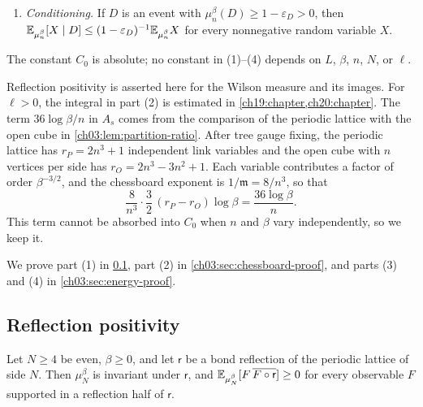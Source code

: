 \begin{theorem}
\begin{enumerate}
\[
 A_s(n,\beta)=C_0+24\log\frac1{1-s}+\frac{36\log\beta}{n}.
\]
Then for every deterministic set $S$ of plaquettes,
\[
 \E_{\mu_n^\beta}\exp\Bigl(\frac s8\sum_{p\in S}\beta q(U_p)\Bigr)\le e^{A_s(n,\beta)\abs S/8}.
\]
For $K\ge0$ and a cell $Q$ let $D_Q(K)=\{\max_{p\subset Q}\beta q(U_p)\ge K\}$. For distinct cells $Q_{t_1},\dots,Q_{t_k}$ of one tiling,
\[
 \mu_n^\beta\Bigl(\bigcap_{j=1}^kD_{Q_{t_j}}(K)\Bigr)\le\bigl[6e^{A_s(n,\beta)-sK}\bigr]^k
\]
and
\[
 \mu_n^\beta\Bigl\{\max_p\beta q(U_p)\ge K\Bigr\}\le\min\bigl\{1,6n^3e^{A_s(n,\beta)-sK}\bigr\}.
\]
If $\beta\le b_+n$ for some $b_+>0$, then $36\log\beta/n\le36b_+/\mathrm e$.
\item\emph{Conditioning.} If $D$ is an event with $\mu_n^\beta(D)\ge1-\varepsilon_D>0$, then $\mathbb E_{\mu_n^\beta}[X\mid D]\le(1-\varepsilon_D)^{-1}\mathbb E_{\mu_n^\beta}X$ for every nonnegative random variable $X$.
\end{enumerate}
The constant $C_0$ is absolute; no constant in (1)--(4) depends on $L$, $\beta$, $n$, $N$, or $\ell$.
\end{theorem}

\begin{remark}\label{ch03:rem:chessboard-scope}
Reflection positivity is asserted here for the Wilson measure and its images. For $\ell>0$, the integral in part (2) is estimated in \cref{ch19:chapter,ch20:chapter}. The term $36\log\beta/n$ in $A_s$ comes from the comparison of the periodic lattice with the open cube in \cref{ch03:lem:partition-ratio}. After tree gauge fixing, the periodic lattice has $r_P=2n^3+1$ independent link variables and the open cube with $n$ vertices per side has $r_O=2n^3-3n^2+1$. Each variable contributes a factor of order $\beta^{-3/2}$, and the chessboard exponent is $1/\mathfrak m=8/n^3$, so that
\[
 \frac8{n^3}\cdot\frac32\,(r_P-r_O)\log\beta=\frac{36\log\beta}{n}.
\]
This term cannot be absorbed into $C_0$ when $n$ and $\beta$ vary independently, so we keep it.
\end{remark}

We prove part (1) in \cref{ch03:sec:rp-proof}, part (2) in \cref{ch03:sec:chessboard-proof}, and parts (3) and (4) in \cref{ch03:sec:energy-proof}.

\subsection{Reflection positivity}\label{ch03:sec:rp-proof}

\begin{lemma}\label{ch03:lem:fine-reflection-positivity}
Let $N\ge4$ be even, $\beta\ge0$, and let $\mathsf r$ be a bond reflection of the periodic lattice of side $N$. Then $\mu_N^\beta$ is invariant under $\mathsf r$, and $\mathbb E_{\mu_N^\beta}[F\,\overline{F\circ\mathsf r}]\ge0$ for every observable $F$ supported in a reflection half of $\mathsf r$.
\end{lemma}

